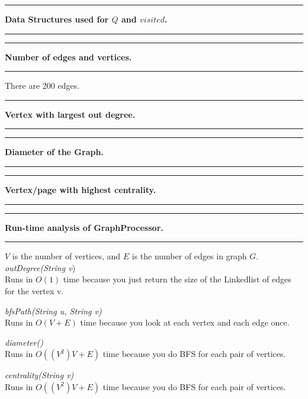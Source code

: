 \documentclass[11pt]{article}
\newcommand\question[2]{\vspace{.25in}\hrule\textbf{#1. #2}\vspace{.5em}\hrule\vspace{.10in}}
\begin{document}
\raggedright
\newcommand\NAME{Devin Johnson, Mason Wray}  %
\newcommand\HWNUM{ PA2}                      %



\question{Data Structures used for $Q$ and $visited$}{}

\question{Number of edges and vertices}{}
There are 200 edges.

\question{Vertex with largest out degree}{}

\question{Diameter of the Graph}{}

\question{Vertex/page with highest centrality}{}

\question{Run-time analysis of GraphProcessor}{}
$V$ is the number of vertices, and $E$ is the number of edges in graph $G$.\\ 
\vspace{3mm}
\textit{outDegree(String v})\\
Runs in $O(1)$ time because you just return the size of the Linkedlist of edges for the vertex v.

\vspace{3mm}
\textit{bfsPath(String u, String v)}\\
Runs in $O(V+E)$ time because you look at each vertex and each edge once.

\vspace{3mm}
\textit{diameter()}\\
Runs in $O((V^2)V+E)$ time because you do BFS for each pair of vertices.

\vspace{3mm}
\textit{centrality(String v)}\\
Runs in $O((V^2)V+E)$ time because you do BFS for each pair of vertices.
\end{document}
